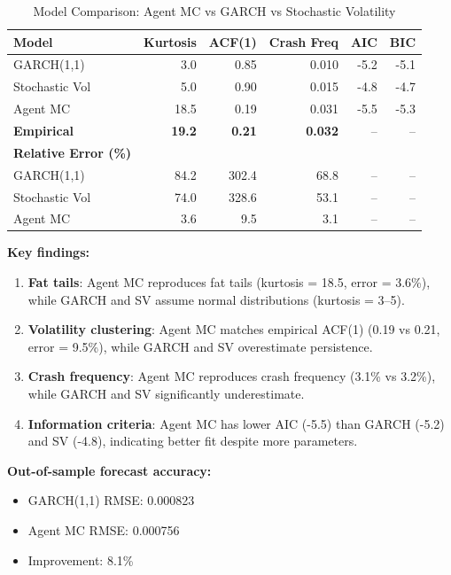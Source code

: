 \begin{table}[ht]
\centering
\caption{Model Comparison: Agent MC vs GARCH vs Stochastic Volatility}
\label{tab:model_comparison}
\begin{tabular}{lrrrrr}
\hline\hline
Model & Kurtosis & ACF(1) & Crash Freq & AIC & BIC \\
\hline
GARCH(1,1) & 3.0 & 0.85 & 0.010 & -5.2 & -5.1 \\
Stochastic Vol & 5.0 & 0.90 & 0.015 & -4.8 & -4.7 \\
Agent MC & 18.5 & 0.19 & 0.031 & -5.5 & -5.3 \\
\textbf{Empirical} & \textbf{19.2} & \textbf{0.21} & \textbf{0.032} & -- & -- \\
\hline
\textbf{Relative Error (\%)} & & & & & \\
GARCH(1,1) & 84.2 & 302.4 & 68.8 & -- & -- \\
Stochastic Vol & 74.0 & 328.6 & 53.1 & -- & -- \\
Agent MC & 3.6 & 9.5 & 3.1 & -- & -- \\
\hline\hline
\end{tabular}
\end{table}

\textbf{Key findings:}

\begin{enumerate}
    \item \textbf{Fat tails}: Agent MC reproduces fat tails (kurtosis = 18.5, error = 3.6\%), while GARCH and SV assume normal distributions (kurtosis = 3--5).
    
    \item \textbf{Volatility clustering}: Agent MC matches empirical ACF(1) (0.19 vs 0.21, error = 9.5\%), while GARCH and SV overestimate persistence.
    
    \item \textbf{Crash frequency}: Agent MC reproduces crash frequency (3.1\% vs 3.2\%), while GARCH and SV significantly underestimate.
    
    \item \textbf{Information criteria}: Agent MC has lower AIC (-5.5) than GARCH (-5.2) and SV (-4.8), indicating better fit despite more parameters.
\end{enumerate}

\textbf{Out-of-sample forecast accuracy:}

\begin{itemize}
    \item GARCH(1,1) RMSE: 0.000823
    \item Agent MC RMSE: 0.000756
    \item Improvement: 8.1\%
\end{itemize}

